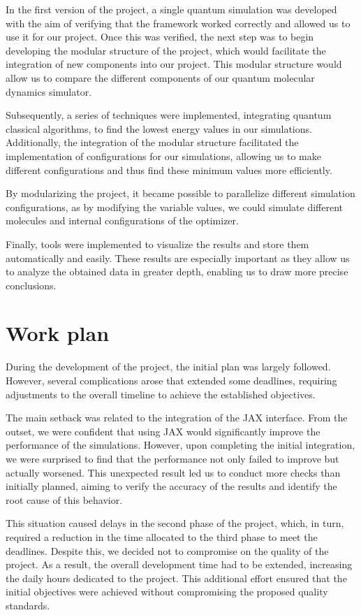 In the first version of the project, a single quantum simulation was developed with the aim of verifying that the framework worked correctly and allowed us to use it for our project. Once this was verified, the next step was to begin developing the modular structure of the project, which would facilitate the integration of new components into our project. This modular structure would allow us to compare the different components of our quantum molecular dynamics simulator.

Subsequently, a series of techniques were implemented, integrating quantum classical algorithms, to find the lowest energy values in our simulations. Additionally, the integration of the modular structure facilitated the implementation of configurations for our simulations, allowing us to make different configurations and thus find these minimum values more efficiently.

By modularizing the project, it became possible to parallelize different simulation configurations, as by modifying the variable values, we could simulate different molecules and internal configurations of the optimizer.

Finally, tools were implemented to visualize the results and store them automatically and easily. These results are especially important as they allow us to analyze the obtained data in greater depth, enabling us to draw more precise conclusions.

\section{Work plan}

During the development of the project, the initial plan was largely followed. However, several complications arose that extended some deadlines, requiring adjustments to the overall timeline to achieve the established objectives.

The main setback was related to the integration of the JAX interface. From the outset, we were confident that using JAX would significantly improve the performance of the simulations. However, upon completing the initial integration, we were surprised to find that the performance not only failed to improve but actually worsened. This unexpected result led us to conduct more checks than initially planned, aiming to verify the accuracy of the results and identify the root cause of this behavior.

This situation caused delays in the second phase of the project, which, in turn, required a reduction in the time allocated to the third phase to meet the deadlines. Despite this, we decided not to compromise on the quality of the project. As a result, the overall development time had to be extended, increasing the daily hours dedicated to the project. This additional effort ensured that the initial objectives were achieved without compromising the proposed quality standards.

